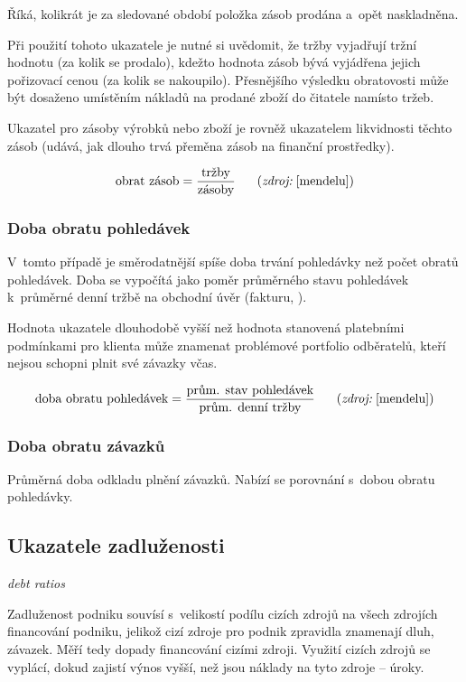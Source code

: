 Říká, kolikrát je za sledované období položka zásob prodána a~opět naskladněna.

Při použití tohoto ukazatele je nutné si uvědomit, že tržby vyjadřují tržní hodnotu (za kolik se prodalo), kdežto hodnota zásob bývá vyjádřena jejich pořizovací cenou (za kolik se nakoupilo). Přesnějšího výsledku obratovosti může být dosaženo umístěním nákladů na prodané zboží do čitatele namísto tržeb.

Ukazatel pro zásoby výrobků nebo zboží je rovněž ukazatelem likvidnosti těchto zásob (udává, jak dlouho trvá přeměna zásob na finanční prostředky).

$$\vz{obrat zásob}{tržby}{zásoby} \scite{mendelu}$$


\subsubsection{Doba obratu pohledávek}
V~tomto případě je směrodatnější spíše doba trvání pohledávky než počet obratů pohledávek. Doba se vypočítá jako poměr průměrného stavu pohledávek k~průměrné denní tržbě na obchodní úvěr (fakturu, ).

Hodnota ukazatele dlouhodobě vyšší než hodnota stanovená platebními podmínkami pro klienta může znamenat problémové portfolio odběratelů, kteří nejsou schopni plnit své závazky včas.

$$\vz{doba obratu pohledávek}{prům. stav pohledávek}{prům. denní tržby} \scite{mendelu}$$

\subsubsection{Doba obratu závazků}
Průměrná doba odkladu plnění závazků. Nabízí se porovnání s~dobou obratu pohledávky. 





\subsection{Ukazatele zadluženosti}
\textit{debt ratios}

Zadluženost podniku souvísí s~velikostí podílu cizích zdrojů na všech zdrojích financování podniku, jelikož cizí zdroje pro podnik zpravidla znamenají dluh, závazek. Měří tedy dopady financování cizími zdroji. Využití cizích zdrojů se vyplácí, dokud zajistí výnos vyšší, než jsou náklady na tyto zdroje -- úroky.

